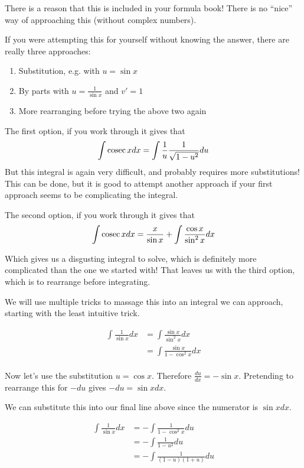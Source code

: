 \begin{solution}
    There is a reason that this is included in your formula book! There is no ``nice'' way of approaching this (without complex numbers).

    If you were attempting this for yourself without knowing the answer, there are really three approaches:
    \begin{enumerate}
        \item Substitution, e.g. with $u=\sin x$
        \item By parts with $u = \frac{1}{\sin x}$ and $v' = 1$
        \item More rearranging before trying the above two again
    \end{enumerate}

    The first option, if you work through it gives that 
    \[ \int \operatorname{cosec} x dx = \int \frac{1}{u} \frac{1}{\sqrt{1 - u^2}}du\]
    But this integral is again very difficult, and probably requires more substitutions! This can be done, but it is good to attempt another approach if your first approach seems to be complicating the integral.

    The second option, if you work through it gives that
    \[ \int \operatorname{cosec} x dx = \frac{x}{\sin x} + \int  \frac{\cos x}{\sin^2 x}dx\]

    Which gives us a disgusting integral to solve, which is definitely more complicated than the one we started with! That leaves us with the third option, which is to rearrange before integrating.

    We will use multiple tricks to massage this into an integral we can approach, starting with the least intuitive trick.

    \begin{align*}
        \int \frac{1}{\sin x} dx &= \int \frac{\sin x }{\sin^2 x}dx \tag{multiply top and bottom by $\sin x$} \\
         &= \int \frac{\sin x}{1 - \cos^2 x}dx \tag{using $\sin^2 x + \cos^2 x = 1$}\\
    \end{align*}

    Now let's use the substitution $u = \cos x$. Therefore $\frac{du}{dx} = -\sin x$. Pretending to rearrange this for $-du$ gives $-du = \sin x dx$.

    We can substitute this into our final line above since the numerator is $\sin x dx$. 

    \begin{align*}
        \int \frac{1}{\sin x} dx &= -\int \frac{1}{1 - \cos^2 x}du \tag{using $-du = \sin x dx$}\\
         &= -\int \frac{1}{1 - u^2}du \tag{using $u = \cos x $} \\
         &= -\int \frac{1}{(1-u)(1+u)}du \tag{difference of two squares}
    \end{align*}


\end{solution}
